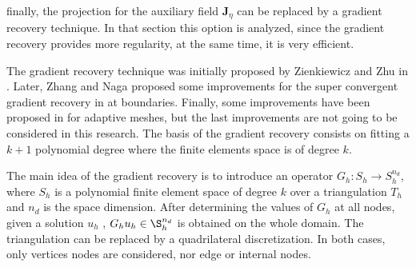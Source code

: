 finally, the projection for the auxiliary field $\mathbf{J}_\eta$ can be replaced by a gradient recovery technique. In that section this option is analyzed, since the gradient recovery provides more regularity, at the same time, it is very efficient.

The gradient recovery technique was initially proposed by Zienkiewicz and Zhu in \cite{zienkiewicz1992}. Later, Zhang and Naga proposed some improvements for the super convergent gradient recovery in \cite{zhang2005} at boundaries. Finally, some improvements have been proposed in \cite{wu2007,ahmed2021} for adaptive meshes, but the last improvements are not going to be considered in this research. The basis of the gradient recovery consists on fitting a $k+1$ polynomial degree where the finite elements space is of degree $k$.

The main idea of the gradient recovery is to introduce an operator $G_h : S_h \rightarrow S_h^{n_d}$, where $S_h$ is a polynomial finite element space of degree $k$ over a triangulation $T_h$ and $n_d$ is the space dimension. After determining the values of $G_h$ at all nodes, given a solution $u_h$ , $G_h u_h \in \S_h^{n_d}$ is obtained on the whole domain.
The triangulation can be replaced by a quadrilateral discretization. In both cases, only vertices nodes are considered, nor edge or internal nodes.

